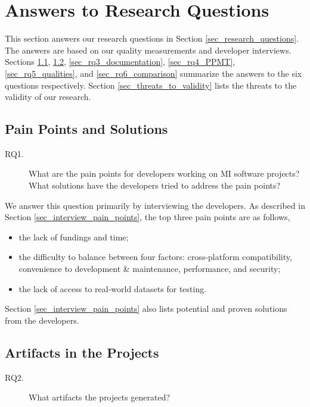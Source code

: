 \chapter{Answers to Research Questions}
\label{ch_answers}

This section answers our research questions in Section \ref{sec_research_questions}. The answers are based on our quality measurements and developer interviews. Sections \ref{sec_rq1_pain_points}, \ref{sec_rq2_artifacts}, \ref{sec_rq3_documentation}, \ref{sec_rq4_PPMT}, \ref{sec_rq5_qualities}, and \ref{sec_rq6_comparison} summarize the answers to the six questions respectively. Section \ref{sec_threats_to_validity} lists the threats to the validity of our research.

\section{Pain Points and Solutions}
\label{sec_rq1_pain_points}
\begin{description}\item[RQ1.] What are the pain points for developers working on MI software projects? What solutions have the developers tried to address the pain points?\end{description}

We answer this question primarily by interviewing the developers. As described in Section \ref{sec_interview_pain_points}, the top three pain points are as follows,
\begin{itemize}
\item the lack of fundings and time;
\item the difficulty to balance between four factors: cross-platform compatibility, convenience to development \& maintenance, performance, and security;
\item the lack of access to real-world datasets for testing.
\end{itemize}

Section \ref{sec_interview_pain_points} also lists potential and proven solutions from the developers.

\section{Artifacts in the Projects}
\label{sec_rq2_artifacts}
\begin{description}\item[RQ2.] What artifacts the projects generated?\end{description}

